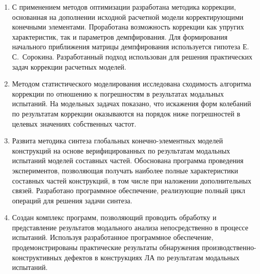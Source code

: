 
\begin{enumerate}
	\item С применением методов оптимизации разработана методика коррекции, основанная на дополнении исходной расчетной модели корректирующими конечными элементами. Проработана возможность коррекции как упругих характеристик, так и параметров демпфирования. Для формирования начального приближения матрицы демпфирования используется гипотеза Е.\,С.~Сорокина. Разработанный подход использован для решения практических задач коррекции  расчетных моделей.
	\item Методом статистического моделирования исследована сходимость алгоритма коррекции по отношению к погрешностям в результатах модальных испытаний. На модельных задачах показано, что искажения форм колебаний по результатам коррекции оказываются на порядок ниже погрешностей в целевых значениях собственных частот.
	\item Развита методика синтеза глобальных конечно-элементных моделей конструкций на основе верифицированных по результатам модальных испытаний моделей составных частей. Обоснована программа проведения экспериментов, позволяющая получать наиболее полные характеристики составных частей конструкций, в том числе при наложении дополнительных связей. Разработано программное обеспечение, реализующие полный цикл операций для решения задачи синтеза.
	\item Создан комплекс программ, позволяющий проводить обработку и представление результатов модального анализа непосредственно в процессе испытаний. Используя разработанное программное обеспечение, продемонстрированы практические результаты обнаружения производственно-конструктивных дефектов в конструкциях ЛА по результатам модальных испытаний.
\end{enumerate}

